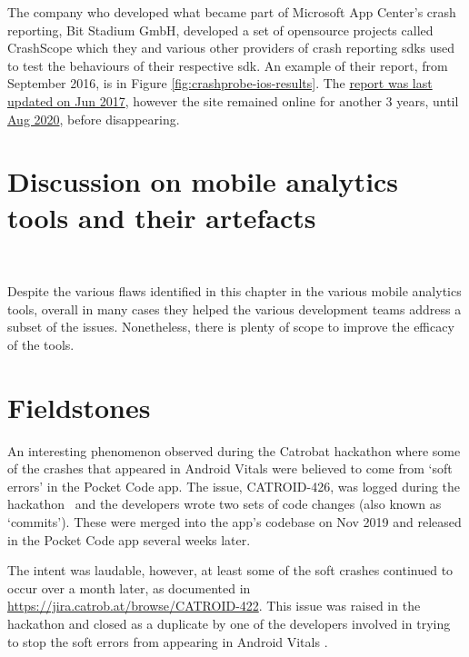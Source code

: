 The company who developed what became part of Microsoft App Center's crash reporting, Bit Stadium GmbH, %
developed a set of opensource projects called CrashScope which they and various other providers of crash reporting \Glspl{sdk} used to test the behaviours of their respective \Gls{sdk}. An example of their report, from  September 2016, is in Figure \ref{fig:crashprobe-ios-results}. The \href{https://github.com/bitstadium/crashprobe.github.com/commit/30844b9794f7cfd48f35d043f255b58f1f70e7e6}{report was last updated on  Jun 2017}, however the site remained online for another 3 years, until \href{https://github.com/bitstadium/crashprobe.github.com/commit/4398b88e263d222ed4d55e1dce59d67de11bfaaa}{ Aug 2020}, before disappearing. 
% 


\section[Discussion]{Discussion on mobile analytics tools and their artefacts}~\label{tata-discussion-section}

Despite the various flaws identified in this chapter in the various mobile analytics tools, overall in many cases they helped the various development teams address a subset of the issues. Nonetheless, there is plenty of scope to improve the efficacy of the tools.




\section{Fieldstones}

An interesting phenomenon observed during the Catrobat hackathon where some of the crashes that appeared in Android Vitals were believed to come from `soft errors' in the Pocket Code app. The issue, CATROID-426, was logged during the hackathon~ and the developers wrote two sets of code changes (also known as `commits'). These were merged into the app's codebase on  Nov 2019 and released in the Pocket Code app several weeks later.

The intent was laudable, however, at least some of the soft crashes continued to occur over a month later, as documented in \url{https://jira.catrob.at/browse/CATROID-422}. This issue was raised in the hackathon and closed as a duplicate by one of the developers involved in trying to stop the soft errors from appearing in Android Vitals .

